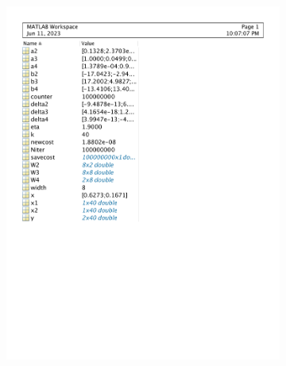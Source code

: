 \documentclass[12pt]{article}
\begin{document}
\begin{enumerate}[label=\bfseries Problem \arabic*:]
\begin{figure}[H]
\begin{subfigure}[t!]{.33\textwidth}
    \includegraphics[width=\linewidth]{PS_7_workspace_new.pdf}
  \end{subfigure}%
\end{figure}

\end{enumerate}
\end{document}
